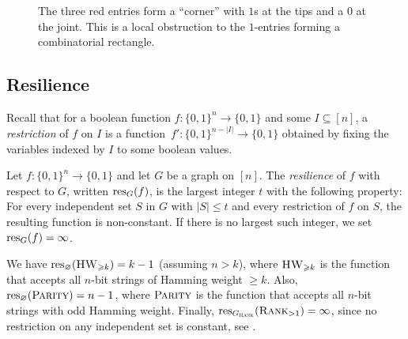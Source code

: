 \documentclass{article}
\begin{document}
\begin{figure}[t]
    \centering
    \begin{minipage}{0.45\textwidth}
        \centering
        
        \vspace{-2em}
        \caption{The dependency graph $G_{\Rank}$ associated with the boolean function $\Rank_{> 1}$ on $\{0,1\}^{5\times 5}$. The neighbourhood of the green vertex $x_{4,1}$ is highlighted in blue.}
        \label{fig:G}
    \end{minipage}
    \hfill
    \begin{minipage}{0.45\textwidth}
        \centering
        
        \vspace{-2em}
        \caption{The three red entries form a ``corner'' with $1$s at the tips and a $0$ at the joint. This is a local obstruction to the $1$-entries forming a combinatorial rectangle.}
        \label{fig:obstruction}
    \end{minipage}
\end{figure}

\subsection{Resilience}

Recall that for a boolean function $f\colon\{0,1\}^n\to\{0,1\}$ and some $I \subseteq [n]$, a \emph{restriction} of $f$ on $I$ is a function~$f'\colon \{0,1\}^{n-|I|}\to \{0,1\}$ obtained by fixing the variables indexed by $I$ to some boolean values.
\begin{boxdefinition}[Resilience]
    Let $f\colon\{0,1\}^n\to \{0,1\}$ and let $G$ be a graph on $[n]$. The \emph{resilience} of $f$ with respect to $G$, written $\operatorname{res}_G(f)$, is the largest integer $t$ with the following property:
    For every independent set $S$ in $G$ with $|S|\leq t$ and every restriction of $f$ on $S$, the resulting function is non-constant. If there is no largest such integer, we set $\operatorname{res}_G(f) = \infty$.
\end{boxdefinition}

\begin{example}\label{ex:resiliance}
    We have $\operatorname{res}_\varnothing(\operatorname{\textsc{HW}}_{\geqslant k}) = k-1$ (assuming $n > k$), where $\operatorname{\textsc{HW}}_{\geqslant k}$ is the function that accepts all $n$-bit strings of Hamming weight $\geq k$. Also, $\operatorname{res}_\varnothing(\operatorname{\textsc{Parity}}) = n-1$, where $\operatorname{\textsc{Parity}}$ is the function that accepts all $n$-bit strings with odd Hamming weight. Finally, $\operatorname{res}_{G_{\operatorname{\textsc{Rank}}}}(\operatorname{\textsc{Rank}}_{>1}) = \infty$, since no restriction on any independent set is constant, see .
\end{example}
\end{document}
